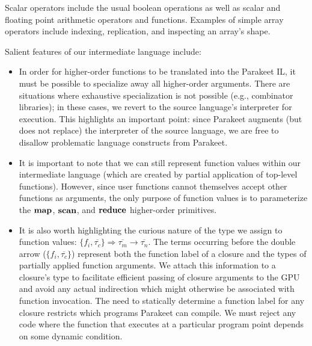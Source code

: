 \documentclass[preprint]{sigplanconf}
\begin{document}
Scalar operators include the usual boolean operations as well as scalar and floating point arithmetic operators and functions. Examples of simple array operators include indexing, replication, and inspecting an array's shape.

Salient features of our intermediate language include:
\begin{itemize}
\item In order for higher-order functions to be translated into the Parakeet IL, it must be possible to specialize away all higher-order arguments. There are situations where exhaustive specialization is not possible (e.g., combinator libraries); in these cases, we revert to the source language's interpreter for
execution. This highlights an important point: since Parakeet augments (but does not replace) the interpreter of the source language, we are free to disallow problematic language constructs from Parakeet.

\item It is important to note that we can still represent function values within our intermediate language (which are created by partial application of top-level functions). However, since user functions cannot themselves accept other functions as arguments, the only purpose of function values is to parameterize the $\mbox{\textbf{map}}$, $\mbox{\textbf{scan}}$, and $\mbox{\textbf{reduce}}$ higher-order primitives.

\item It is also worth highlighting the curious nature of the type we assign to function values:
$ \{ f_i, \overline{\tau_{c}} \} \Rightarrow \overline{\tau_m} \rightarrow \overline{\tau_n}$.  The terms occurring before the double arrow ($\{f_i, \overline{\tau_{c}} \}$) represent both the function label of a closure and the types of partially applied function arguments. We attach this information to a closure's type to facilitate efficient passing of closure arguments to the GPU and avoid any actual indirection which might otherwise be associated with function invocation. The need to statically determine a function label for any closure restricts which programs Parakeet can compile. We must reject any code where the function
that executes at a particular program point depends on some dynamic condition.
\end{itemize}
\end{document}
